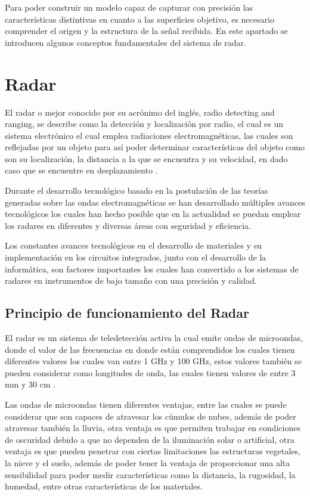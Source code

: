 
Para poder construir un modelo capaz de capturar con precisión las características distintivas en cuanto a las superficies objetivo, es necesario comprender el origen y la estructura de la señal recibida. En este apartado se introducen algunos conceptos fundamentales del sistema de radar.

\section{Radar}

El radar o mejor conocido por su acrónimo del inglés, radio detecting and ranging, se describe como la detección y localización por radio, el cual es un sistema electrónico el cual emplea radiaciones electromagnéticas, las cuales son reflejadas por un objeto para así poder determinar características del objeto como son su localización, la distancia a la que se encuentra y su velocidad, en dado caso que se encuentre en desplazamiento \cite{AlonsoCerpa}.

Durante el desarrollo tecnológico basado en la postulación de las teorías generadas sobre las ondas electromagnéticas se han desarrollado múltiples avances tecnológicos los cuales han hecho posible que en la actualidad se puedan emplear los radares en diferentes y diversas áreas con seguridad y eficiencia. 

Los constantes avances tecnológicos en el desarrollo de materiales y su implementación en los circuitos integrados, junto con el desarrollo de la informática, son factores importantes los cuales han convertido a los sistemas de radares en instrumentos de bajo tamaño con una precisión y calidad. 

\subsection{Principio de funcionamiento del Radar}

El radar es un sistema de teledetección activa la cual emite ondas de microondas, donde el valor de las frecuencias en donde están comprendidos los cuales tienen diferentes valores los cuales van entre 1 GHz y 100 GHz, estos valores también se pueden considerar como longitudes de onda, las cuales tienen valores de entre 3 mm y 30 cm \cite{HerreraG2009}. 

Las ondas de microondas tienen diferentes ventajas, entre las cuales se puede considerar que son capaces de atravesar los cúmulos de nubes, además de poder atravesar también la lluvia, otra ventaja es que permiten trabajar en condiciones de oscuridad debido a que no dependen de la iluminación solar o artificial, otra ventaja es que pueden penetrar con ciertas limitaciones las estructuras vegetales, la nieve y el suelo, además de poder tener la ventaja de proporcionar una alta sensibilidad para poder medir características como la distancia, la rugosidad, la humedad, entre otras características de los materiales. 

